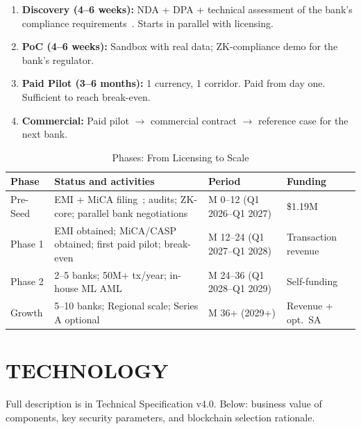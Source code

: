 \documentclass[11pt,a4paper]{article}
\begin{document}
\begin{enumerate}[leftmargin=2em, itemsep=4pt, parsep=0pt]
\item \textbf{Discovery (4--6 weeks):} NDA + DPA + technical assessment of the bank's compliance requirements~\cite{fatf_rec}. Starts in parallel with licensing.
\item \textbf{PoC (4--6 weeks):} Sandbox with real data; ZK-compliance demo for the bank's regulator.
\item \textbf{Paid Pilot (3--6 months):} 1 currency, 1 corridor. Paid from day one. Sufficient to reach break-even.
\item \textbf{Commercial:} Paid pilot $\to$ commercial contract $\to$ reference case for the next bank.
\end{enumerate}

\begin{table}[htbp]
\centering
\caption{Phases: From Licensing to Scale}
\small
\begin{tabularx}{\linewidth}{@{}lXll@{}}
\toprule
\textbf{Phase} & \textbf{Status and activities} & \textbf{Period} & \textbf{Funding} \\
\midrule
Pre-Seed  & EMI + MiCA filing~\cite{lb_emi,mica_reg}; audits; ZK-core; parallel bank negotiations     & M 0--12 (Q1 2026--Q1 2027)       & \$1.19M \\
Phase 1   & EMI obtained; MiCA/CASP obtained; first paid pilot; break-even     & M 12--24 (Q1 2027--Q1 2028)      & Transaction revenue \\
Phase 2   & 2--5 banks; 50M+ tx/year; in-house ML AML                          & M 24--36 (Q1 2028--Q1 2029)      & Self-funding \\
Growth    & 5--10 banks; Regional scale; Series A optional                     & M 36+ (2029+)                    & Revenue + opt.\ SA \\
\bottomrule
\end{tabularx}
\end{table}


\FloatBarrier
\section{TECHNOLOGY}

Full description is in Technical Specification v4.0. Below: business value of components, key security parameters, and blockchain selection rationale.
\end{document}
